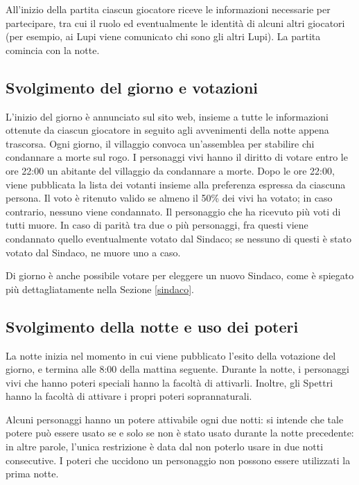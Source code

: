 \documentclass[a4paper,10pt]{article}
\begin{document}
All'inizio della partita ciascun giocatore riceve le informazioni necessarie per partecipare, tra cui il ruolo ed eventualmente le identità di alcuni altri giocatori (per esempio, ai Lupi viene comunicato chi sono gli altri Lupi). La partita comincia con la notte.

\subsection{Svolgimento del giorno e votazioni}

L'inizio del giorno è annunciato sul sito web, insieme a tutte le informazioni ottenute da ciascun giocatore in seguito agli avvenimenti della notte appena trascorsa. Ogni giorno, il villaggio convoca un'assemblea per stabilire chi condannare a morte sul rogo. I personaggi vivi hanno il diritto di votare entro le ore 22:00 un abitante del villaggio da condannare a morte. Dopo le ore 22:00, viene pubblicata la lista dei votanti insieme alla preferenza espressa da ciascuna persona.
Il voto è ritenuto valido se almeno il 50\% dei vivi ha votato; in caso contrario, nessuno viene condannato. Il personaggio che ha ricevuto più voti di tutti muore.
In caso di parità tra due o più personaggi, fra questi viene condannato quello eventualmente votato dal Sindaco; se nessuno di questi è stato votato dal Sindaco, ne muore uno a caso.

Di giorno è anche possibile votare per eleggere un nuovo Sindaco, come è spiegato più dettagliatamente nella Sezione \ref{sindaco}.


\subsection{Svolgimento della notte e uso dei poteri}

La notte inizia nel momento in cui viene pubblicato l'esito della votazione del giorno, e termina alle 8:00 della mattina seguente. Durante la notte, i personaggi vivi che hanno poteri speciali hanno la facoltà di attivarli. Inoltre, gli Spettri hanno la facoltà di attivare i propri poteri soprannaturali.

Alcuni personaggi hanno un potere attivabile ogni due notti: si intende che tale potere può essere usato se e solo se non è stato usato durante la notte precedente: in altre parole, l'unica restrizione è data dal non poterlo usare in due notti consecutive. I poteri che uccidono un personaggio non possono essere utilizzati la prima notte.
\end{document}
